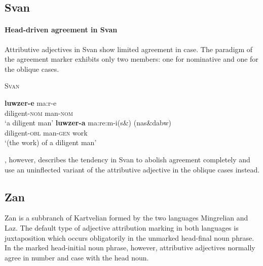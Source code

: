 \subsection{Svan}
\paragraph{Head-driven agreement in Svan}
Attributive adjectives in Svan show limited agreement in case. The paradigm of the agreement marker exhibits only two members: one for nominative and one for the oblique cases.
\begin{exe}
\ex \textsc{Svan} \cite[18]{tuite1997}
\begin{xlist}
\ex	
\gll 	\textbf{luwzer-e}	ma:r-e\\
	diligent-\textsc{nom} man-\textsc{nom}\\
\glt	‘a diligent man’
\ex	
\gll	\textbf{luwzer-a}	ma:re:m-i(s\&) (nas\&dabw)\\
	diligent-\textsc{obl} man-\textsc{gen} work\\
\glt	‘(the work) of a diligent man’
\end{xlist}
\end{exe}
\citet[499]{schmidt1991}, however, describes the tendency in Svan to abolish agreement completely and use an uninflected variant of the attributive adjective in the oblique cases instead.

\subsection{Zan}
Zan is a subbranch of Kartvelian formed by the two languages Mingrelian and Laz. The default type of adjective attribution marking in both languages is juxtaposition which occurs obligatorily in the unmarked head-final noun phrase. In the marked head-initial noun phrase, however, attributive adjectives normally agree in number and case with the head noun.

